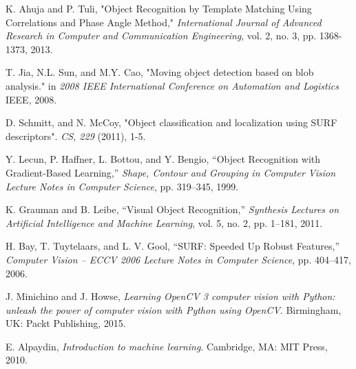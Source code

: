 \documentclass[journal,twoside]{IEEEtran}
\begin{document}
%
%
%
\begin{thebibliography}{1}

        K. Ahuja and P. Tuli, "Object Recognition by Template Matching Using Correlations and Phase Angle Method," 
        \emph{International Journal of Advanced Research in Computer and Communication Engineering}, 
        vol. 2, no. 3, pp. 1368-1373, 2013.

        T. Jia, N.L. Sun, and M.Y. Cao, 
        "Moving object detection based on blob analysis." 
        in \emph{2008 IEEE International Conference on Automation and Logistics} 
        IEEE, 2008.

        D. Schmitt, and  N. McCoy, "Object classification and localization using SURF descriptors". 
        \emph{CS, 229} (2011), 1-5.

        Y. Lecun, P. Haffner, L. Bottou, and Y. Bengio, “Object Recognition with Gradient-Based Learning,” 
        \emph{Shape, Contour and Grouping in Computer Vision Lecture Notes in Computer Science}, pp. 319–345, 1999.

        K. Grauman and B. Leibe, “Visual Object Recognition,” 
        \emph{Synthesis Lectures on Artificial Intelligence and Machine Learning}, vol. 5, no. 2, pp. 1–181, 2011. 

        H. Bay, T. Tuytelaars, and L. V. Gool, “SURF: Speeded Up Robust Features,” 
        \emph{Computer Vision – ECCV 2006 Lecture Notes in Computer Science}, pp. 404–417, 2006. 

        J. Minichino and J. Howse, 
        \emph{Learning OpenCV 3 computer vision with Python: unleash the power of computer vision with Python using OpenCV}. 
        Birmingham, UK: Packt Publishing, 2015. 

        E. Alpaydin, 
        \emph{Introduction to machine learning}. Cambridge, MA: MIT Press, 2010. 


\end{thebibliography}
\end{document}
